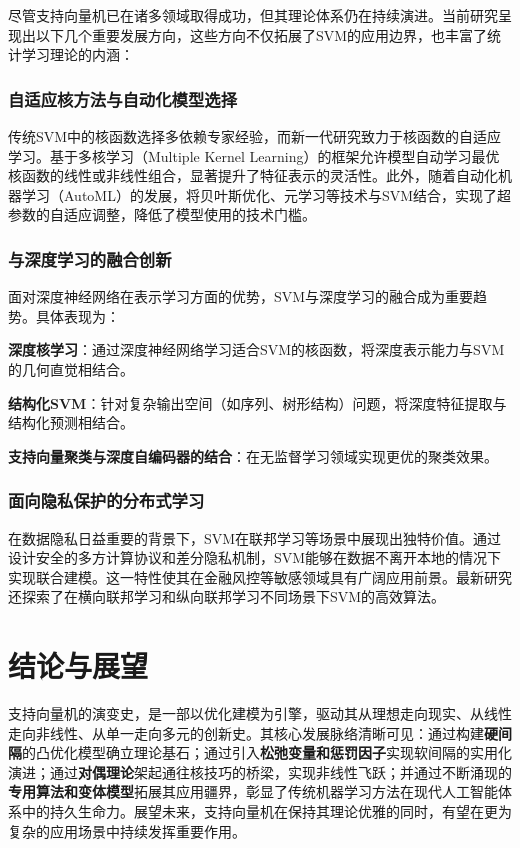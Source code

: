 \documentclass{article}
\newenvironment{solution_cn}{%
  \begin{proof}[解答]%
}{%
  \end{proof}%
}
\begin{document}
\begin{solution_cn}
尽管支持向量机已在诸多领域取得成功，但其理论体系仍在持续演进。当前研究呈现出以下几个重要发展方向，这些方向不仅拓展了SVM的应用边界，也丰富了统计学习理论的内涵：

\subsubsection{自适应核方法与自动化模型选择}
传统SVM中的核函数选择多依赖专家经验，而新一代研究致力于核函数的自适应学习。基于多核学习（Multiple Kernel Learning）的框架允许模型自动学习最优核函数的线性或非线性组合，显著提升了特征表示的灵活性。此外，随着自动化机器学习（AutoML）的发展，将贝叶斯优化、元学习等技术与SVM结合，实现了超参数的自适应调整，降低了模型使用的技术门槛。

\subsubsection{与深度学习的融合创新}
面对深度神经网络在表示学习方面的优势，SVM与深度学习的融合成为重要趋势。具体表现为：

\textbf{深度核学习}：通过深度神经网络学习适合SVM的核函数，将深度表示能力与SVM的几何直觉相结合。

\textbf{结构化SVM}：针对复杂输出空间（如序列、树形结构）问题，将深度特征提取与结构化预测相结合。

\textbf{支持向量聚类与深度自编码器的结合}：在无监督学习领域实现更优的聚类效果。

\subsubsection{面向隐私保护的分布式学习}
在数据隐私日益重要的背景下，SVM在联邦学习等场景中展现出独特价值。通过设计安全的多方计算协议和差分隐私机制，SVM能够在数据不离开本地的情况下实现联合建模。这一特性使其在金融风控等敏感领域具有广阔应用前景。最新研究还探索了在横向联邦学习和纵向联邦学习不同场景下SVM的高效算法。

\section{结论与展望}

支持向量机的演变史，是一部以优化建模为引擎，驱动其从理想走向现实、从线性走向非线性、从单一走向多元的创新史。其核心发展脉络清晰可见：通过构建\textbf{硬间隔}的凸优化模型确立理论基石；通过引入\textbf{松弛变量和惩罚因子}实现软间隔的实用化演进；通过\textbf{对偶理论}架起通往核技巧的桥梁，实现非线性飞跃；并通过不断涌现的\textbf{专用算法和变体模型}拓展其应用疆界，彰显了传统机器学习方法在现代人工智能体系中的持久生命力。展望未来，支持向量机在保持其理论优雅的同时，有望在更为复杂的应用场景中持续发挥重要作用。

\end{solution_cn}
\end{document}
